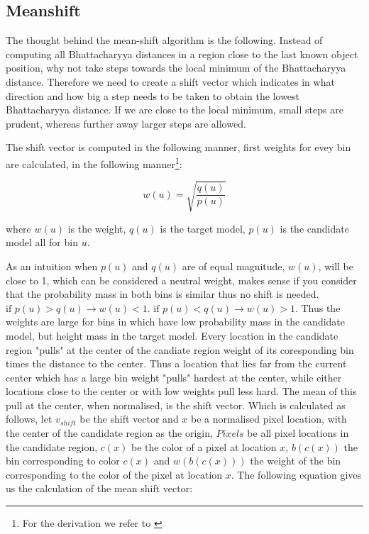 \documentclass[a4paper,11pt]{article}
\begin{document}
\subsection{Meanshift}

The thought behind the mean-shift algorithm is the following. Instead of computing all Bhattacharyya distances in a region close to the last known object position, why not take steps towards the local minimum of the Bhattacharyya distance. Therefore we need to create a shift vector which indicates in what direction and how big a step needs to be taken to obtain the lowest Bhattacharyya distance. If we are close to the local minimum, small steps are prudent, whereas further away larger steps are allowed. 



The shift vector is computed in the following manner, first weights for evey bin are calculated, in the following manner\footnote{For the derivation we refer to \cite{mean_shift}\label{fn:derivation_refer}}:



\begin{equation}

\label{eq:weights}

w(u) = \sqrt{\frac{q(u)}{p(u)}}

\end{equation} %

where $w(u)$ is the weight, $q(u)$ is the target model, $p(u)$ is the candidate model all for bin $u$.



As an intuition when $p(u)$ and $q(u)$ are of equal magnitude, $w(u)$, will be close to 1, which can be considered a neutral weight, makes sense if you consider that the probability mass in both bins is similar thus no shift is needed. $\textrm{if }p(u) > q(u) \rightarrow w(u) < 1$.  $\textrm{if }p(u) < q(u) \rightarrow w(u) > 1$. Thus the weights are large for bins in  which have low probability mass in the candidate model, but height mass in the target model. Every location in the candidate region "pulls" at the center of the candiate region  weight of its coresponding bin times the distance to the center. Thus a location that lies far from the current center which has a large bin weight "pulls" hardest at the center, while either locations close to the center or with low weights pull less hard. The mean of this pull at the center, when normalised, is the shift vector. Which is calculated as follows, let $v_{shift}$ be the shift vector and $x$ be a normalised pixel location, with the center of the candidate region as the origin, $Pixels$ be all pixel locations in the candidate region, $c(x)$ be the color of a pixel at location $x$, $b(c(x))$ the bin corresponding to color $c(x)$ and $w(b(c(x)))$ the weight of the bin corresponding to the color of the pixel at location $x$. The following equation gives us the calculation of the mean shift vector:
\end{document}
